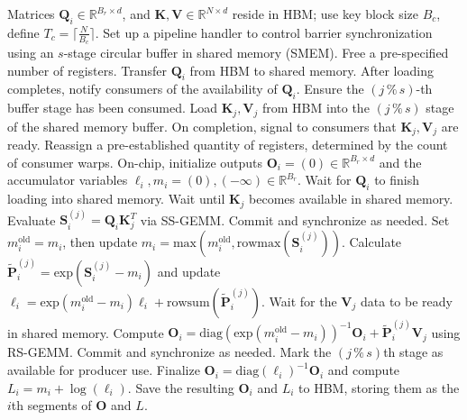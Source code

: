 \begin{algorithm}[H]
    \caption{\small\label{alg:flash3_wgmma_ws_only}\textsc{FlashAttention-3} forward pass \textbf{excluding} intra-consumer overlap -- CTA perspective}
    \begin{algorithmic}[1]
\REQUIRE Matrices $\mathbf{Q}_i \in \mathbb{R}^{B_r \times d}$, and $\mathbf{K}, \mathbf{V} \in \mathbb{R}^{N \times d}$ reside in HBM; use key block size $B_c$, define $T_c = \lceil \frac{N}{B_c} \rceil$.
\STATE Set up a pipeline handler to control barrier synchronization using an $s$-stage circular buffer in shared memory (SMEM).
\STATE Free a pre-specified number of registers.
\STATE Transfer $\mathbf{Q}_i$ from HBM to shared memory.
\STATE After loading completes, notify consumers of the availability of $\mathbf{Q}_i$.
    \STATE Ensure the $(j\,\%\,s)$-th buffer stage has been consumed.
    \STATE Load $\mathbf{K}_j, \mathbf{V}_j$ from HBM into the $(j\,\%\,s)$ stage of the shared memory buffer.
    \STATE On completion, signal to consumers that $\mathbf{K}_j, \mathbf{V}_j$ are ready.
\ENDFOR
\ELSE \STATE Reassign a pre-established quantity of registers, determined by the count of consumer warps.
\STATE On-chip, initialize outputs $\mathbf{O}_i = (0) \in \mathbb{R}^{B_r \times d}$ and the accumulator variables $\ell_i, m_i = (0), (-\infty) \in \mathbb{R}^{B_r}$.
\STATE Wait for $\mathbf{Q}_i$ to finish loading into shared memory.
\STATE Wait until $\mathbf{K}_j$ becomes available in shared memory.
\STATE Evaluate $\mathbf{S}_i^{(j)} = \mathbf{Q}_i \mathbf{K}_j^T$ via SS-GEMM. Commit and synchronize as needed. \label{alg:ws_only_gemm1}
\STATE Set $m_i^{\mathrm{old}} = m_i$, then update $m_i = \mathrm{max}(m_i^{\mathrm{old}}, \mathrm{rowmax}(\mathbf{S}_i^{(j)}))$. \label{code-ws:softmax_start}
\STATE Calculate $\widetilde{\mathbf{P}}_i^{(j)} = \mathrm{exp}(\mathbf{S}_i^{(j)} - m_i)$ and update $\ell_i = \mathrm{exp}(m_i^{\mathrm{old}} - m_i) \ell_i + \mathrm{rowsum}(\widetilde{\mathbf{P}}_i^{(j)})$. \label{code-ws:softmax_end}
\STATE Wait for the $\mathbf{V}_j$ data to be ready in shared memory.
\STATE Compute $\mathbf{O}_i = \mathrm{diag}(\mathrm{exp}(m_i^{\mathrm{old}} - m_i))^{-1} \mathbf{O}_i + \widetilde{\mathbf{P}}_i^{(j)} \mathbf{V}_j$ using RS-GEMM. Commit and synchronize as needed. \label{alg:ws_only_gemm2}
\STATE Mark the $(j\,\%\,s)$th stage as available for producer use.
\ENDFOR
\STATE Finalize $\mathbf{O}_i = \mathrm{diag}(\ell_i)^{-1} \mathbf{O}_i$ and compute $L_i = m_i + \log(\ell_i)$.
\STATE Save the resulting $\mathbf{O}_i$ and $L_i$ to HBM, storing them as the $i$th segments of $\mathbf{O}$ and $L$.
\ENDIF
\end{algorithmic}
\end{algorithm}

